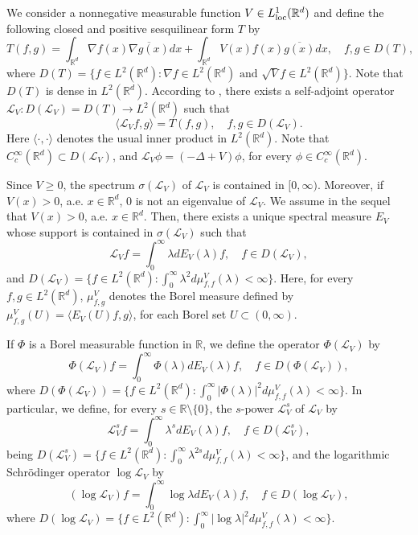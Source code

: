\documentclass[10pt, a4paper, reqno]{amsart}
\theoremstyle{definition}
\theoremstyle{remark}
\numberwithin{equation}{section}
\begin{document}
We consider a nonnegative measurable function $V\in L^1_\textup{loc}(\mathbb R^d)$ and define the following closed and positive sesquilinear form $T$ by
\[
T(f,g)=\int_{\mathbb R ^d}\nabla f(x)\overline{\nabla g(x)}dx+\int_{\mathbb R^d}V(x)f(x)\overline{g(x)}dx,\quad f,g\in D(T),
\]
where $D(T)=\{f\in L^2(\mathbb R^d): \nabla f\in L^2(\mathbb R^d) \mbox{ and }\sqrt{V}f\in L^2(\mathbb R^d)\}$. Note that $D(T)$ is dense in $L^2(\mathbb R^d)$. According to  \cite[Theorem VIII.15]{RS}, there exists a self-adjoint operator $\mathcal L_V: D(\mathcal L_V)=D(T)\rightarrow L^2(\mathbb R^d)$ such that
\[
\langle \mathcal L_Vf,g\rangle=T(f,g),\quad f,g\in D(\mathcal L_V).
\]
Here $\langle \cdot,\cdot\rangle$ denotes the usual inner product in $L^2(\mathbb R^d)$. Note that $C_c^\infty (\mathbb R^d)\subset D(\mathcal L_V)$, and $\mathcal L_V\phi =(-\Delta +V)\phi$, for every $\phi \in C_c^\infty (\mathbb R^d)$.

Since $V\geq 0$, the spectrum $\sigma(\mathcal L_V)$ of $\mathcal L_V$ is contained in $[0,\infty )$. Moreover, if $V(x)>0$, a.e. $x\in \mathbb R^d$, $0$ is not an eigenvalue of $\mathcal L_V$. We assume in the sequel that $V(x)>0$, a.e. $x\in \mathbb R^d$. Then, there exists a unique spectral measure $E_V$ whose support is contained in $\sigma (\mathcal L_V)$ such that
\[
\mathcal L_Vf=\int_0^\infty \lambda dE_V(\lambda )f,\quad f\in D(\mathcal L_V),
\]
and $D(\mathcal L_V)=\{f\in L^2(\mathbb R^d): \int_0^\infty \lambda ^2d\mu_{f,f}^V(\lambda )<\infty\}$. Here, for every $f,g\in L^2(\mathbb R^d)$, $\mu _{f,g}^V$ denotes the Borel measure defined by $\mu_{f,g}^V(U)=\langle E_V(U)f,g\rangle$, for each Borel set $U\subset (0,\infty)$.

If $\Phi $ is a Borel measurable function in $\mathbb R$, we define the operator $\Phi(\mathcal L_V)$ by
\[
\Phi (\mathcal L_V)f=\int_0^\infty \Phi (\lambda )dE_V(\lambda )f,\quad f\in D(\Phi (\mathcal L_V)),
\]
where $D(\Phi (\mathcal L_V))=\{f\in L^2(\mathbb R^d): \int_0^\infty |\Phi (\lambda )|^2d\mu_{f,f}^V(\lambda )<\infty\}$. In particular, we define, for every $s\in \mathbb{R}\setminus\{0\}$, the $s$-power $\mathcal{L}_V^s$ of $\mathcal{L}_V$ by
\[
\mathcal{L}_V^sf=\int^\infty_0\lambda^sdE_V(\lambda)f,\quad f\in D(\mathcal{L}_V^s),
\]
being $D(\mathcal{L}_V^s)=\{f\in L^2(\mathbb{R}^d): \int_0^\infty\lambda^{2s}d\mu_{f,f}^V(\lambda)<\infty\}$, and the logarithmic Schr\"odinger operator $\log \mathcal L_V$ by
\[
(\log \mathcal L_V)f=\int_0^\infty \log \lambda dE_V(\lambda )f,\quad f\in D(\log \mathcal L_V), 
\]
where $D(\log  \mathcal L_V)=\{f\in L^2(\mathbb R^d): \int_0^\infty |\log \lambda |^2d\mu_{f,f}^V(\lambda )<\infty\}$.
\end{document}
